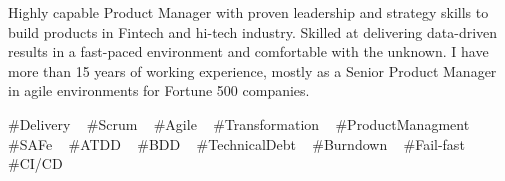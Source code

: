 

\begin{cvparagraph}


   Highly capable Product Manager with proven leadership and strategy skills to build products in Fintech and hi-tech industry. Skilled at delivering data-driven results in a fast-paced environment and comfortable with the unknown. I have more than 15 years of working experience, mostly as a Senior Product Manager in agile environments for Fortune 500 companies.


\end{cvparagraph}
\begin{cvtechnologies}
 \#Delivery  ~
 \#Scrum ~
 \#Agile ~
 \#Transformation ~
 \#ProductManagment ~
 \#SAFe ~
 \#ATDD ~
  \#BDD ~
  \#TechnicalDebt ~
  \#Burndown ~
  \#Fail-fast ~
  \#CI/CD ~
 \end{cvtechnologies}
